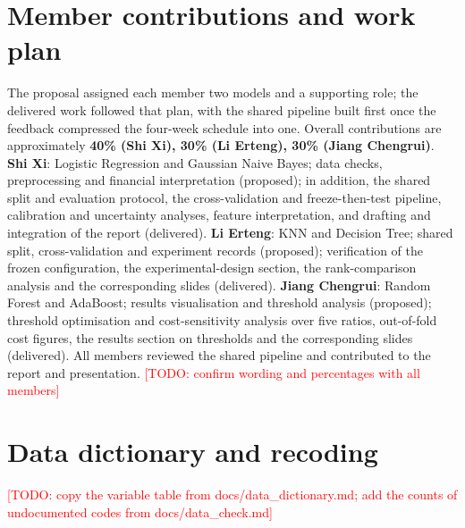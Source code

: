 \documentclass{article}
\newcommand{\todo}[1]{\textcolor{red}{[TODO: #1]}}
\begin{document}
\section*{Member contributions and work plan}
The proposal assigned each member two models and a supporting role; the delivered work followed that plan, with the shared pipeline built first once the feedback compressed the four-week schedule into one. Overall contributions are approximately \textbf{40\% (Shi Xi), 30\% (Li Erteng), 30\% (Jiang Chengrui)}. \textbf{Shi Xi}: Logistic Regression and Gaussian Naive Bayes; data checks, preprocessing and financial interpretation (proposed); in addition, the shared split and evaluation protocol, the cross-validation and freeze-then-test pipeline, calibration and uncertainty analyses, feature interpretation, and drafting and integration of the report (delivered). \textbf{Li Erteng}: KNN and Decision Tree; shared split, cross-validation and experiment records (proposed); verification of the frozen configuration, the experimental-design section, the rank-comparison analysis and the corresponding slides (delivered). \textbf{Jiang Chengrui}: Random Forest and AdaBoost; results visualisation and threshold analysis (proposed); threshold optimisation and cost-sensitivity analysis over five ratios, out-of-fold cost figures, the results section on thresholds and the corresponding slides (delivered). All members reviewed the shared pipeline and contributed to the report and presentation. \todo{confirm wording and percentages with all members}




\clearpage
\appendix
\section{Data dictionary and recoding}
\label{app:data}
\todo{copy the variable table from docs/data\_dictionary.md; add the counts of undocumented codes from docs/data\_check.md}
\end{document}
